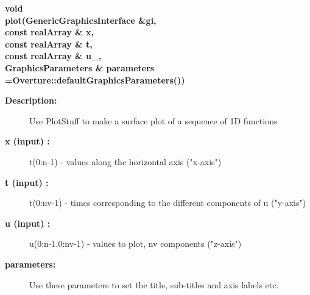 \begin{flushleft} \textbf{%
void  \\ 
\settowidth{\PlotStuffIncludeArgIndent}{plot(}%
plot(GenericGraphicsInterface \&gi,\\ 
\hspace{\PlotStuffIncludeArgIndent}const realArray \& x, \\ 
\hspace{\PlotStuffIncludeArgIndent}const realArray \& t,\\ 
\hspace{\PlotStuffIncludeArgIndent}const realArray \& u\_, \\ 
GraphicsParameters \& parameters  =Overture::defaultGraphicsParameters())
}\end{flushleft}
\begin{description}
\item[{\bf Description:}] 
    Use PlotStuff to make a surface plot of a sequence of 1D functions
\item[{\bf x (input) :}]  t(0:n-1) - values along the horizontal axis ("x-axis")
\item[{\bf t (input) :}]  t(0:nv-1) - times corresponding to the different components of u ("y-axis")
\item[{\bf u (input) :}]  u(0:n-1,0:nv-1) - values to plot, nv components  ("z-axis")
 
\item[{\bf parameters:}]  Use these parameters to set the title, sub-titles and axis labels etc.
\end{description}
